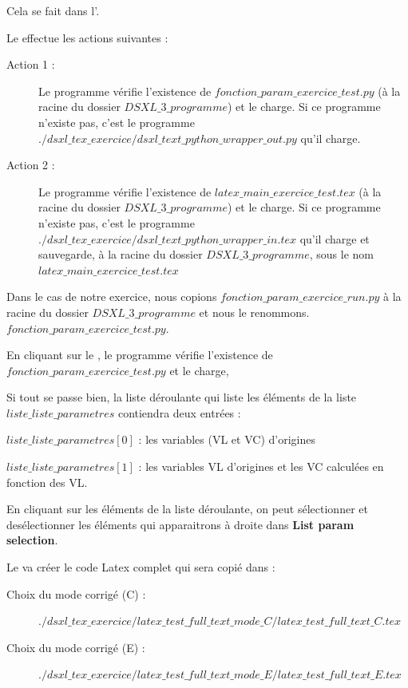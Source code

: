 {Cela se fait  dans l'. 

Le  effectue les actions suivantes : 
\begin{description}
 \item[Action 1 : ]Le programme vérifie l'existence de {\bf $fonction\_param\_exercice\_test.py$} (à la racine du dossier {\bf $DSXL\_3\_programme$}) et le charge. 
 Si ce programme n'existe pas, c'est le  programme {\bf $./dsxl\_tex\_exercice/dsxl\_text\_python\_wrapper\_out.py$} qu'il charge.
 \item[Action 2 : ]Le programme vérifie l'existence de {\bf $latex\_main\_exercice\_test.tex$} (à la racine du dossier {\bf $DSXL\_3\_programme$}) et le charge.
  Si ce programme n'existe pas, c'est le  programme {\bf $./dsxl\_tex\_exercice/dsxl\_text\_python\_wrapper\_in.tex$} qu'il charge et sauvegarde, 
  à la racine du dossier {\bf $DSXL\_3\_programme$}, sous le nom {\bf $latex\_main\_exercice\_test.tex$}
\end{description}

Dans le cas de notre exercice, nous copions {\bf $fonction\_param\_exercice\_run.py$} à la racine du dossier {\bf $DSXL\_3\_programme$} et nous le renommons. 
{\bf $fonction\_param\_exercice\_test.py$}. 

En cliquant sur le , le programme vérifie l'existence de {\bf $fonction\_param\_exercice\_test.py$} et le charge,  

Si tout se passe bien, la liste déroulante qui liste les éléments de la liste {$liste\_liste\_parametres$} contiendra deux entrées : 
\begin{description}
 \item $liste\_liste\_parametres[0]$ : les variables (VL et VC) d'origines
 \item $liste\_liste\_parametres[1]$ : les variables VL d'origines et les VC calculées en fonction des VL. 
\end{description}

En cliquant sur les éléments de la liste déroulante, on peut sélectionner et desélectionner les éléments qui apparaitrons à droite dans {\bf List param selection}. 

Le  va créer le code Latex complet qui sera copié dans :
\begin{description}
 \item[Choix du mode corrigé (C) : ]
{\bf $./dsxl\_tex\_exercice/latex\_test\_full\_text\_mode\_C/latex\_test\_full\_text\_C.tex$} 
 \item[Choix du mode corrigé (E) : ]
{\bf $./dsxl\_tex\_exercice/latex\_test\_full\_text\_mode\_E/latex\_test\_full\_text\_E.tex$} 
\end{description}

}
